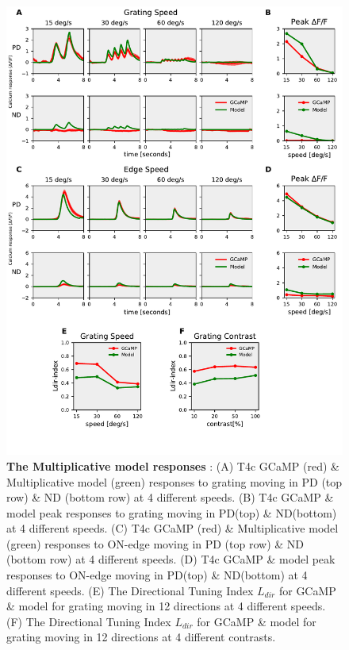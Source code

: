 \documentclass[9pt,lineno]{elife}
\begin{document}
\begin{figure}
\begin{fullwidth}
\includegraphics[width=0.84\linewidth]{figure5}
\caption{\textbf{The Multiplicative model responses} : (A) T4c GCaMP (red) \& Multiplicative model (green) responses to grating moving in PD (top row) \& ND (bottom row) at 4 different speeds. (B) T4c GCaMP \& model peak responses to grating moving in PD(top) \& ND(bottom) at 4 different speeds. (C) T4c GCaMP (red) \& Multiplicative model (green) responses to ON-edge moving in PD (top row) \& ND (bottom row) at 4 different speeds. (D) T4c GCaMP \& model peak responses to ON-edge moving in PD(top) \& ND(bottom) at 4 different speeds. (E) The Directional Tuning Index $L_{dir}$ for GCaMP \& model for grating moving in 12 directions at 4 different speeds. (F) The Directional Tuning Index $L_{dir}$ for GCaMP \& model for grating moving in 12 directions at 4 different contrasts.}

\label{PDNDModel}
	
\end{fullwidth}
\end{figure} 
\end{document}
